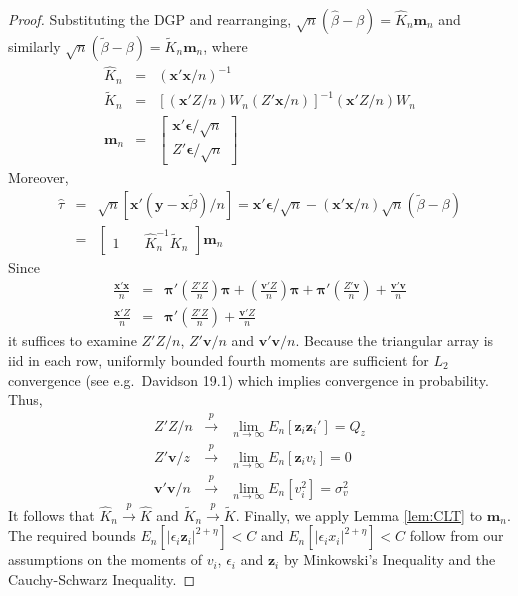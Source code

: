 \documentclass[12pt]{article}\usepackage[]{graphicx}\usepackage[]{color}
\theoremstyle{definition}
\begin{document}
\begin{proof}
Substituting the DGP and rearranging, $\sqrt{n}\left( \widehat{\beta} - \beta\right) = \widehat{K}_n \boldsymbol{m}_n$ and similarly
$\sqrt{n} \left( \widetilde{\beta} - \beta\right) = \widetilde{K}_n \boldsymbol{m}_n$, where
  \begin{eqnarray*}
    \widehat{K}_n&=&  \left(\mathbf{x}'\mathbf{x}/n\right)^{-1}\\
    \widetilde{K}_n&=&\left[\left(\mathbf{x}'Z/n\right) W_n \left(Z'\mathbf{x}/n\right)\right]^{-1}\left(\mathbf{x}'Z/n\right) W_n \\
  \boldsymbol{m}_n &=& \left[
\begin{array}{c}
\mathbf{x}'\boldsymbol{\epsilon}/\sqrt{n}\\
Z'\boldsymbol{\epsilon}/\sqrt{n}
\end{array}
\right]
\end{eqnarray*}
Moreover,
  \begin{eqnarray*}
   \widehat{\tau} &=& \sqrt{n} \left[\mathbf{x}'(\mathbf{y} - \mathbf{x}\widetilde{\beta})/n\right] =\mathbf{x}'\boldsymbol{\epsilon}/\sqrt{n} -  (\mathbf{x}'\mathbf{x}/n)\sqrt{n}(\widetilde{\beta} - \beta) \\
        &=& \left[\begin{array}{cc} 1 \quad &\widehat{K}_n^{-1}\widetilde{K}_n\end{array}\right]\boldsymbol{m}_n
  \end{eqnarray*}
Since
  \begin{eqnarray*}
    \frac{\mathbf{x}'\mathbf{x}}{n} &=& \boldsymbol{\pi}'\left(\frac{Z'Z}{n}\right) \boldsymbol{\pi} + \left(\frac{\mathbf{v}'Z}{n}\right)\boldsymbol{\pi} +\boldsymbol{\pi}' \left(\frac{Z'\mathbf{v}}{n} \right) + \frac{\mathbf{v}'\mathbf{v}}{n}\\
      \frac{\mathbf{x}'Z}{n}&=&  \boldsymbol{\pi}' \left(\frac{Z'Z}{n}\right) + \frac{\mathbf{v}'Z}{n}
  \end{eqnarray*}
it suffices to examine $Z'Z/n$, $Z'\mathbf{v}/n$ and $\mathbf{v}'\mathbf{v}/n$. Because the triangular array is iid in each row, uniformly bounded fourth moments are sufficient for $L_2$ convergence (see e.g.\ Davidson 19.1) which implies convergence in probability. Thus,
  \begin{eqnarray*}
    Z'Z/n &\overset{p}{\rightarrow}& \lim_{n\rightarrow \infty} E_n[\mathbf{z}_i \mathbf{z}_i'] = Q_z \\
    Z' \mathbf{v}/z &\overset{p}{\rightarrow}& \lim_{n\rightarrow \infty} E_n[\mathbf{z}_i v_i] = 0\\
    \mathbf{v}'\mathbf{v}/n &\overset{p}{\rightarrow}& \lim_{n \rightarrow \infty} E_n[v_i^2] = \sigma^2_v 
  \end{eqnarray*}  
It follows that $\widehat{K}_n\overset{p}{\rightarrow} \widehat{K}$ and $\widetilde{K}_n \overset{p}{\rightarrow} \widetilde{K}$. Finally, we apply Lemma \ref{lem:CLT} to $\boldsymbol{m}_n$. The required bounds $E_n\left[\left| \epsilon_i \mathbf{z}_i \right|^{2+\eta}\right] <C$ and $E_n\left[\left| \epsilon_i x_i \right|^{2+\eta}\right] < C$ follow
from our assumptions on the moments of $v_i$, $\epsilon_i$ and $\mathbf{z}_i$ by Minkowski's Inequality and the Cauchy-Schwarz Inequality.
\end{proof}
\end{document}
